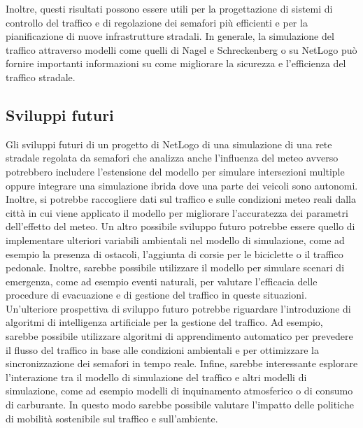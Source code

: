 \documentclass[11pt]{article}
\begin{document}
Inoltre, questi risultati possono essere utili per la progettazione di sistemi di controllo del traffico e di regolazione dei semafori più efficienti e per la pianificazione di nuove infrastrutture stradali. In generale, la simulazione del traffico attraverso modelli come quelli di Nagel e Schreckenberg o su NetLogo può fornire importanti informazioni su come migliorare la sicurezza e l'efficienza del traffico stradale.

\subsection{Sviluppi futuri}
Gli sviluppi futuri di un progetto di NetLogo di una simulazione di una rete stradale regolata da semafori che analizza anche l'influenza del meteo avverso potrebbero includere l'estensione del modello per simulare intersezioni multiple oppure integrare una simulazione ibrida dove una parte dei veicoli sono autonomi.
Inoltre, si potrebbe raccogliere dati sul traffico e sulle condizioni meteo reali dalla città in cui viene applicato il modello per migliorare l'accuratezza dei parametri dell'effetto del meteo. Un altro possibile sviluppo futuro potrebbe essere quello di implementare ulteriori variabili ambientali nel modello di simulazione, come ad esempio la presenza di ostacoli, l'aggiunta di corsie per le biciclette o il traffico pedonale. Inoltre, sarebbe possibile utilizzare il modello per simulare scenari di emergenza, come ad esempio eventi naturali, per valutare l'efficacia delle procedure di evacuazione e di gestione del traffico in queste situazioni.
Un'ulteriore prospettiva di sviluppo futuro potrebbe riguardare l'introduzione di algoritmi di intelligenza artificiale per la gestione del traffico. Ad esempio, sarebbe possibile utilizzare algoritmi di apprendimento automatico per prevedere il flusso del traffico in base alle condizioni ambientali e per ottimizzare la sincronizzazione dei semafori in tempo reale.
Infine, sarebbe interessante esplorare l'interazione tra il modello di simulazione del traffico e altri modelli di simulazione, come ad esempio modelli di inquinamento atmosferico o di consumo di carburante. In questo modo sarebbe possibile valutare l'impatto delle politiche di mobilità sostenibile sul traffico e sull'ambiente.


\nocite{*}
\newpage

\end{document}
